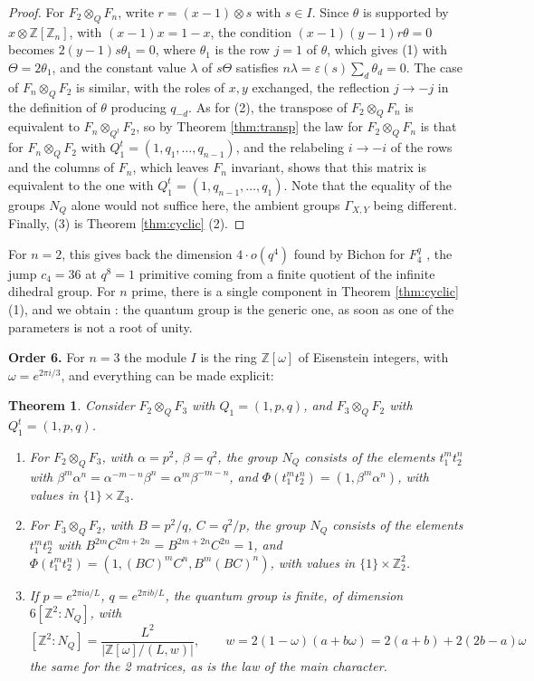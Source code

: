 \documentclass[11pt]{amsart}
\newtheorem{theorem}{Theorem}[section]
\begin{document}
\begin{proof}
For $F_2\otimes_QF_n$, write $r=(x-1)\otimes s$ with $s\in I$. Since $\theta$ is supported by $x\otimes\mathbb Z[\mathbb Z_n]$, with $(x-1)x=1-x$, the condition $(x-1)(y-1)r\theta=0$ becomes $2(y-1)s\theta_1=0$, where $\theta_1$ is the row $j=1$ of $\theta$, which gives (1) with $\Theta=2\theta_1$, and the constant value $\lambda$ of $s\Theta$ satisfies $n\lambda=\varepsilon(s)\sum_d\theta_d=0$. The case of $F_n\otimes_QF_2$ is similar, with the roles of $x,y$ exchanged, the reflection $j\to-j$ in the definition of $\theta$ producing $q_{-d}$. As for (2), the transpose of $F_2\otimes_QF_n$ is equivalent to $F_n\otimes_{Q^t}F_2$, so by Theorem \ref{thm:transp} the law for $F_2\otimes_QF_n$ is that for $F_n\otimes_QF_2$ with $Q^t_1=(1,q_1,\ldots,q_{n-1})$, and the relabeling $i\to-i$ of the rows and the columns of $F_n$, which leaves $F_n$ invariant, shows that this matrix is equivalent to the one with $Q^t_1=(1,q_{n-1},\ldots,q_1)$. Note that the equality of the groups $N_Q$ alone would not suffice here, the ambient groups $\Gamma_{X,Y}$ being different. Finally, (3) is Theorem \ref{thm:cyclic} (2).
\end{proof}

\noindent For $n=2$, this gives back the dimension $4\cdot o(q^4)$ found by Bichon for $F_4^q$ \cite{bic}, the jump $c_4=36$ at $q^8=1$ primitive coming from a finite quotient of the infinite dihedral group. For $n$ prime, there is a single component in Theorem \ref{thm:cyclic} (1), and we obtain \cite[Theorem 5.1]{bic}: the quantum group is the generic one, as soon as one of the parameters is not a root of unity.

\medskip

\noindent\textbf{Order 6.} For $n=3$ the module $I$ is the ring $\mathbb Z[\omega]$ of Eisenstein integers, with $\omega=e^{2\pi i/3}$, and everything can be made explicit:

\begin{theorem}\label{thm:order6}
Consider $F_2\otimes_QF_3$ with $Q_1=(1,p,q)$, and $F_3\otimes_QF_2$ with $Q^t_1=(1,p,q)$.
\begin{enumerate}
\item For $F_2\otimes_QF_3$, with $\alpha=p^2$, $\beta=q^2$, the group $N_Q$ consists of the elements $t_1^mt_2^n$ with $\beta^m\alpha^n=\alpha^{-m-n}\beta^n=\alpha^m\beta^{-m-n}$, and $\Phi(t_1^mt_2^n)=(1,\beta^m\alpha^n)$, with values in $\{1\}\times\mathbb Z_3$.

\item For $F_3\otimes_QF_2$, with $B=p^2/q$, $C=q^2/p$, the group $N_Q$ consists of the elements $t_1^mt_2^n$ with $B^{2m}C^{2m+2n}=B^{2m+2n}C^{2n}=1$, and $\Phi(t_1^mt_2^n)=(1,(BC)^mC^n,B^m(BC)^n)$, with values in $\{1\}\times\mathbb Z_2^2$.

\item If $p=e^{2\pi ia/L}$, $q=e^{2\pi ib/L}$, the quantum group is finite, of dimension $6[\mathbb Z^2:N_Q]$, with
$$[\mathbb Z^2:N_Q]=\frac{L^2}{\left|\mathbb Z[\omega]/(L,w)\right|},\qquad w=2(1-\omega)(a+b\omega)=2(a+b)+2(2b-a)\omega$$
the same for the 2 matrices, as is the law of the main character.
\end{enumerate}
\end{theorem}
\end{document}
